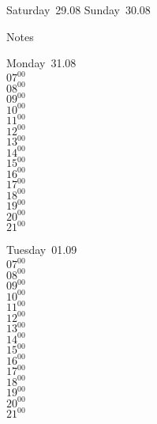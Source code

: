 \documentclass[11pt,a4paper]{book}\usepackage[]{graphicx}\usepackage[]{color}
\begin{document}
\begin{weekendbox}
  Saturday~29.08
  \tcblower
  Sunday~30.08
\end{weekendbox} %
\begin{notebox}
  Notes
\end{notebox}
\clearpage
\begin{headerbox}
\end{headerbox}
\begin{weekdaybox}
  Monday~31.08\\
  { 
  \vfill
  $07^{00}$\\
$08^{00}$\\
$09^{00}$\\
$10^{00}$\\
$11^{00}$\\
$12^{00}$\\
$13^{00}$\\
$14^{00}$\\
$15^{00}$\\
$16^{00}$\\
$17^{00}$\\
$18^{00}$\\
$19^{00}$\\
$20^{00}$\\
$21^{00}$\\
  }
\end{weekdaybox}
\begin{weekdaybox}
  Tuesday~01.09\\
  { 
  \vfill
  $07^{00}$\\
$08^{00}$\\
$09^{00}$\\
$10^{00}$\\
$11^{00}$\\
$12^{00}$\\
$13^{00}$\\
$14^{00}$\\
$15^{00}$\\
$16^{00}$\\
$17^{00}$\\
$18^{00}$\\
$19^{00}$\\
$20^{00}$\\
$21^{00}$\\
  }
\end{weekdaybox}
\end{document}
